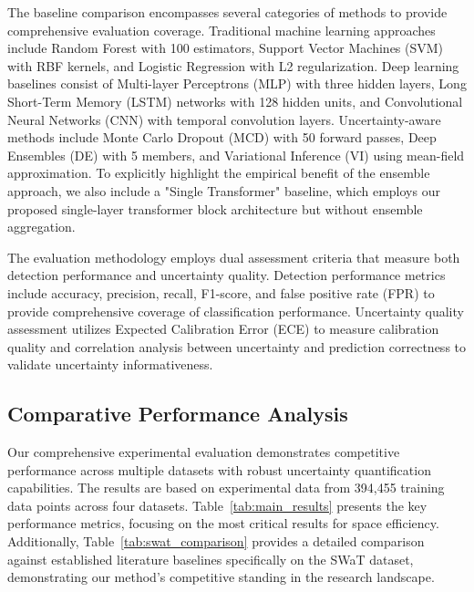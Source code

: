 \documentclass[journal]{IEEEtran}
\begin{document}
The baseline comparison encompasses several categories of methods to provide comprehensive evaluation coverage. Traditional machine learning approaches include Random Forest with 100 estimators, Support Vector Machines (SVM) with RBF kernels, and Logistic Regression with L2 regularization. Deep learning baselines consist of Multi-layer Perceptrons (MLP) with three hidden layers, Long Short-Term Memory (LSTM) networks with 128 hidden units, and Convolutional Neural Networks (CNN) with temporal convolution layers. Uncertainty-aware methods include Monte Carlo Dropout (MCD) with 50 forward passes, Deep Ensembles (DE) with 5 members, and Variational Inference (VI) using mean-field approximation. To explicitly highlight the empirical benefit of the ensemble approach, we also include a "Single Transformer" baseline, which employs our proposed single-layer transformer block architecture but without ensemble aggregation.

The evaluation methodology employs dual assessment criteria that measure both detection performance and uncertainty quality. Detection performance metrics include accuracy, precision, recall, F1-score, and false positive rate (FPR) to provide comprehensive coverage of classification performance. Uncertainty quality assessment utilizes Expected Calibration Error (ECE) to measure calibration quality and correlation analysis between uncertainty and prediction correctness to validate uncertainty informativeness.

\subsection{Comparative Performance Analysis}

Our comprehensive experimental evaluation demonstrates competitive performance across multiple datasets with robust uncertainty quantification capabilities. The results are based on experimental data from 394,455 training data points across four datasets. Table~\ref{tab:main_results} presents the key performance metrics, focusing on the most critical results for space efficiency. Additionally, Table~\ref{tab:swat_comparison} provides a detailed comparison against established literature baselines specifically on the SWaT dataset, demonstrating our method's competitive standing in the research landscape.
\end{document}
